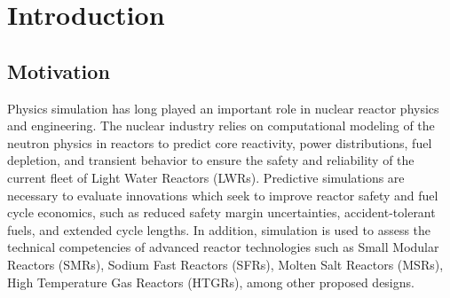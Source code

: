 \chapter{Introduction}
\label{chap:intro}

\section{Motivation}
\label{sec:chap1-motivation}




Physics simulation has long played an important role in nuclear reactor physics and engineering. The nuclear industry relies on computational modeling of the neutron physics in reactors to predict core reactivity, power distributions, fuel depletion, and transient behavior to ensure the safety and reliability of the current fleet of Light Water Reactors (LWRs). Predictive simulations are necessary to evaluate innovations which seek to improve reactor safety and fuel cycle economics, such as reduced safety margin uncertainties, accident-tolerant fuels, and extended cycle lengths. In addition, simulation is used to assess the technical competencies of advanced reactor technologies such as Small Modular Reactors (SMRs), Sodium Fast Reactors (SFRs), Molten Salt Reactors (MSRs), High Temperature Gas Reactors (HTGRs), among other proposed designs. 

